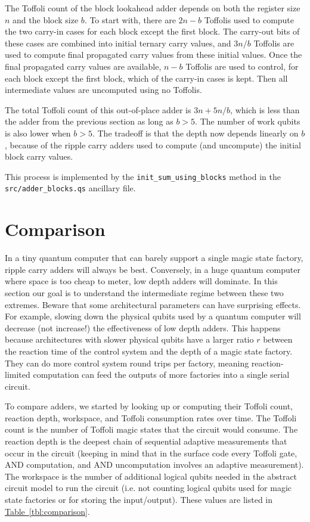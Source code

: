 \documentclass[onecolumn,unpublished]{quantumarticle}
\theoremstyle{definition}
\theoremstyle{definition}
\theoremstyle{definition}
\newcommand{\tbl}[1]{\hyperref[tbl:#1]{Table~\ref*{tbl:#1}}}
\begin{document}
The Toffoli count of the block lookahead adder depends on both the register size $n$ and the block size $b$.
To start with, there are $2n-b$ Toffolis used to compute the two carry-in cases for each block except the first block.
The carry-out bits of these cases are combined into initial ternary carry values, and $3n/b$ Toffolis are used to compute final propagated carry values from these initial values.
Once the final propagated carry values are available, $n-b$ Toffolis are used to control, for each block except the first block, which of the carry-in cases is kept.
Then all intermediate values are uncomputed using no Toffolis.

The total Toffoli count of this out-of-place adder is $3n + 5n/b$, which is less than the adder from the previous section as long as $b > 5$.
The number of work qubits is also lower when $b > 5$.
The tradeoff is that the depth now depends linearly on $b$, because of the ripple carry adders used to compute (and uncompute) the initial block carry values.

This process is implemented by the \texttt{init\_sum\_using\_blocks} method in the \\\texttt{src/adder\_blocks.qs} ancillary file.


\section{Comparison}
\label{sec:estimate}

In a tiny quantum computer that can barely support a single magic state factory, ripple carry adders will always be best.
Conversely, in a huge quantum computer where space is too cheap to meter, low depth adders will dominate.
In this section our goal is to understand the intermediate regime between these two extremes.
Beware that some architectural parameters can have surprising effects.
For example, slowing down the physical qubits used by a quantum computer will decrease (not increase!) the effectiveness of low depth adders.
This happens because architectures with slower physical qubits have a larger ratio $r$ between the reaction time of the control system and the depth of a magic state factory.
They can do more control system round trips per factory, meaning reaction-limited computation can feed the outputs of more factories into a single serial circuit.

To compare adders, we started by looking up or computing their Toffoli count, reaction depth, workspace, and Toffoli consumption rates over time.
The Toffoli count is the number of Toffoli magic states that the circuit would consume.
The reaction depth is the deepest chain of sequential adaptive measurements that occur in the circuit (keeping in mind that in the surface code every Toffoli gate, AND computation, and AND uncomputation involves an adaptive measurement).
The workspace is the number of additional logical qubits needed in the abstract circuit model to run the circuit (i.e. not counting logical qubits used for magic state factories or for storing the input/output).
These values are listed in \tbl{comparison}.
\end{document}
